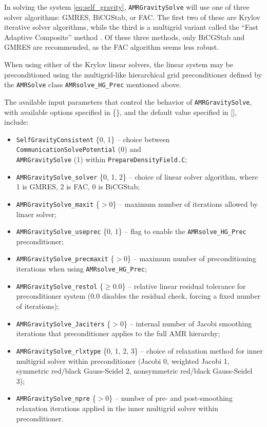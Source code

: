 \documentclass[letterpaper,10pt]{article}
\renewcommand{\(}{\left(}
\renewcommand{\)}{\right)}
\newcommand{\amrsolve}{{\tt AMRSolve} }
\begin{document}
In solving the system \eqref{eq:self_gravity}, {\tt AMRGravitySolve}
will use one of three solver algorithms: GMRES, BiCGStab, or FAC.  The
first two of these are Krylov iterative solver algorithms, while the
third is a multigrid variant called the ``Fast Adaptive Composite''
method \cite{McCormick1989}.  Of these three methods, only BiCGStab
and GMRES are recommended, as the FAC algorithm seems less robust.

When using either of the Krylov linear solvers, the linear system may
be preconditioned using the multigrid-like hierarchical grid
preconditioner defined by the \amrsolve class {\tt AMRsolve\_HG\_Prec}
mentioned above.  

The available input parameters that control the behavior of 
{\tt AMRGravitySolve}, with available options specified in \{\}, and
the default value specified in [], include:
\begin{itemize}
\item {\tt SelfGravityConsistent} \{0, 1\; [0]\} -- choice between
  {\tt CommunicationSolvePotential} (0) and \\
  {\tt AMRGravitySolve} (1) within {\tt PrepareDensityField.C};
\item {\tt AMRGravitySolve\_solver} \{0, 1, 2\; [0]\} -- choice of
  linear solver algorithm, where 1 is GMRES, 2 is FAC, 0 is BiCGStab;
\item {\tt AMRGravitySolve\_maxit} \{$>0$\; [200]\} -- maximum number
  of iterations allowed by linaer solver;
\item {\tt AMRGravitySolve\_useprec} \{0, 1\; [1]\} -- flag to enable
  the {\tt AMRsolve\_HG\_Prec} preconditioner;
\item {\tt AMRGravitySolve\_precmaxit} \{$>0$\; [1]\} -- maximum
  number of preconditioning iterations when using 
  {\tt AMRsolve\_HG\_Prec};
\item {\tt AMRGravitySolve\_restol} \{$\ge 0.0$\; [0.0]\} -- relative
  linear residual tolerance for preconditioner system (0.0 disables
  the residual check, forcing a fixed number of iterations);
\item {\tt AMRGravitySolve\_Jaciters} \{$>0$\; [3]\} -- internal
  number of Jacobi smoothing iterations that preconditioner applies to
  the full AMR hierarchy;
\item {\tt AMRGravitySolve\_rlxtype} \{0, 1, 2, 3\; [2]\} -- choice of 
  relaxation method for inner multigrid solver within preconditioner
  (Jacobi 0, weighted Jacobi 1, symmetric red/black Gauss-Seidel 2,
  nonsymmetric red/black Gauss-Seidel 3);
\item {\tt AMRGravitySolve\_npre} \{$>0$\; [2]\} -- number of pre- and
  post-smoothing relaxation iterations applied in the inner multigrid
  solver within preconditioner. 
\end{itemize}
\end{document}
